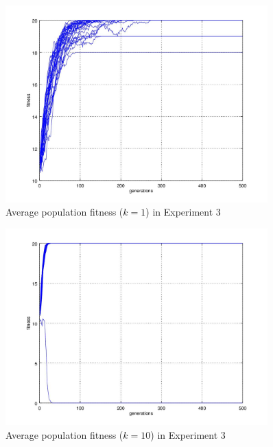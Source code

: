 \documentclass{article}
\begin{document}
\begin{figure}
  
\centering
\includegraphics[keepaspectratio,width=0.9\textwidth]{experiment3figure2_1.jpg}

\caption{Average population fitness ($k = 1$) in Experiment 3}

\label{fig:experiment3_1}

\end{figure}


\begin{figure}

\centering
\includegraphics[keepaspectratio,width=0.9\textwidth]{experiment3figure2_10.jpg}

\caption{Average population fitness ($k = 10$) in Experiment 3}

\label{fig:experiment3_10}

\end{figure}
\end{document}
